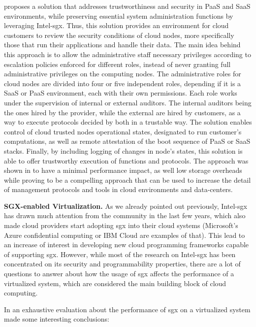 \cite{sgxCloudThesis} proposes a solution that addresses trustworthiness and security in PaaS and SaaS environments, while preserving essential system administration functions by leveraging Intel-\gls{sgx}. Thus, this solution provides an environment for cloud customers to review the security conditions of cloud nodes, more specifically those that run their applications and handle their data.
The main idea behind this approach is to allow the administrative staff necessary privileges according to escalation policies enforced for different roles, instead of never granting full administrative privileges on the computing nodes.
The administrative roles for cloud nodes are divided into four or five independent roles, depending if it is a SaaS or PaaS environment, each with their own permissions. Each role works under the supervision of internal or external auditors. The internal auditors being the ones hired by the provider, while the external are hired by customers, as a way to execute protocols decided by both in a trustable way. The solution enables control of cloud trusted nodes operational states, designated to run customer's computations, as well as remote attestation of the boot sequence of PaaS or SaaS stacks. Finally, by including logging of changes in node's states, this solution is able to offer trustworthy execution of functions and protocols.
The approach was shown in \cite{sgxCloudThesis} to have a minimal performance impact, as well low storage overheads while proving to be a compelling approach that can be used to increase the detail of management protocols and tools in cloud environments and data-centers.\newline

\textbf{SGX-enabled Virtualization.}
As we already pointed out previously, Intel-\gls{sgx} has drawn much attention from the community in the last few years, which also made cloud providers start adopting \gls{sgx} into their cloud systems (Microsoft's Azure confidential computing or IBM Cloud are examples of that). This lead to an increase of interest in developing new cloud programming frameworks capable of supporting \gls{sgx}.
However, while most of the research on Intel-\gls{sgx} has been concentrated on its security and programmability properties, there are a lot of questions to answer about how the usage of \gls{sgx} affects the performance of a virtualized system, which are considered the main building block of cloud computing.

In \cite{sgxVirtualizationPaper} an exhaustive evaluation about the performance of \gls{sgx} on a virtualized system made some interesting conclusions:

